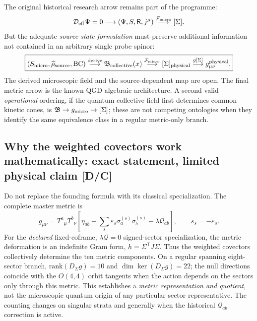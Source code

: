 \documentclass[11pt,a4paper]{article}
\begin{document}
The original historical research arrow remains part of the programme:
\begin{equation}\label{eq:v13-historical-arrow}
\mathcal D_{\rm eff}\Psi=0\longrightarrow(\Psi,S,\mathsf R,j^\mu)
\overset{\mathcal F_{\rm micro}}{\longrightarrow}[\Sigma].
\end{equation}
But the adequate \emph{source-state formulation} must preserve additional information not contained in an arbitrary single probe spinor:
\begin{equation}\label{eq:v13-research-arrow}
\boxed{
(S_{\rm micro},\widehat\rho_{\rm source},\mathrm{BC})
\overset{\text{derive}}{\longrightarrow}
\mathfrak B_{\rm collective}(x)
\overset{\mathcal F_{\rm micro}}{\longrightarrow}
[\Sigma]_{\rm physical}
\overset{g[\Sigma]}{\longrightarrow}
 g_{\mu\nu}^{\rm physical}.}
\end{equation}
The derived microscopic field and the source-dependent map are open. The final metric arrow is the known QGD algebraic architecture. A second valid \emph{operational} ordering, if the quantum collective field first determines common kinetic cones, is $\mathfrak B\to g_{\rm micro}\to[\Sigma]$; these are not competing ontologies when they identify the same equivalence class in a regular metric-only branch.

\subsection{Why the weighted covectors work mathematically: exact statement, limited physical claim [D/C]}
\label{sec:v13-master-metric}
Do not replace the founding formula with its classical specialization. The complete master metric is
\begin{equation}\label{eq:v13-master}
\boxed{g_{\mu\nu}=T^a{}_{\mu}T^b{}_{\nu}
\left[\eta_{ab}-\sum_s\varepsilon_s\sigma_a^{(s)}\sigma_b^{(s)}
-\lambda\mathcal Q_{ab}\right],\qquad s_s=-\varepsilon_s.}
\end{equation}
For the \emph{declared} fixed-coframe, $\lambda\mathcal Q=0$ signed-sector specialization, the metric deformation is an indefinite Gram form, $h=\Sigma^\mathsf TJ\Sigma$. Thus the weighted covectors collectively determine the ten metric components. On a regular spanning eight-sector branch, $\mathrm{rank}(D_\Sigma g)=10$ and $\dim\ker(D_\Sigma g)=22$; the null directions coincide with the $O(4,4)$ orbit tangents when the action depends on the sectors only through this metric. This establishes a \emph{metric representation and quotient}, not the microscopic quantum origin of any particular sector representative. The counting changes on singular strata and generally when the historical $\mathcal Q_{ab}$ correction is active.
\end{document}
